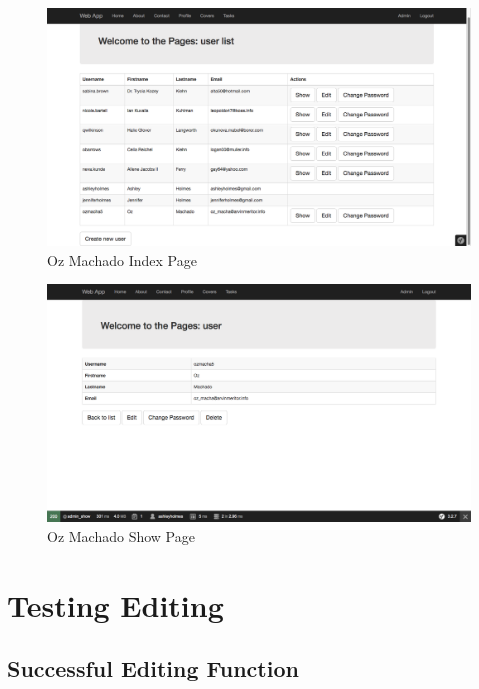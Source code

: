 
\begin{figure}[htbp]
   \centering
   \includegraphics[width=400pt]{figures/ozmacha5_index.png} %
   \caption{Oz Machado Index Page}
   \label{fig:Oz Machado Index Page}
\end{figure}

\begin{figure}[htbp]
   \centering
   \includegraphics[width=400pt]{figures/ozmacha5_show.png} %
   \caption{Oz Machado Show Page}
   \label{fig:Oz Machado Show Page}
\end{figure}

\section{Testing Editing}

\subsection{Successful Editing Function}

